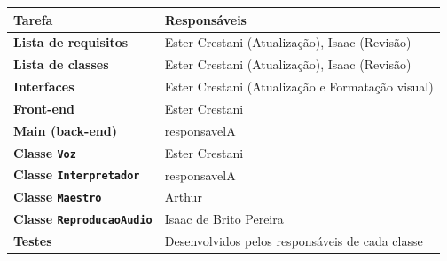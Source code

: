 \documentclass[12pt, a4paper]{article}
\begin{document}
\begin{center}
\begin{tabular}{>{\bfseries}p{4cm} p{9cm}}
  \toprule
  Tarefa & Responsáveis \\
  \midrule
  Lista de requisitos & Ester Crestani (Atualização), Isaac (Revisão) \\
  Lista de classes & Ester Crestani (Atualização), Isaac (Revisão) \\
  Interfaces & Ester Crestani (Atualização e Formatação visual) \\
  Front-end & Ester Crestani \\
  Main (back-end) & responsavelA \\
  Classe \texttt{Voz} & Ester Crestani \\
  Classe \texttt{Interpretador} & responsavelA \\
  Classe \texttt{Maestro} & Arthur \\
  Classe \texttt{ReproducaoAudio} & Isaac de Brito Pereira \\
  Testes & Desenvolvidos pelos responsáveis de cada classe \\
  \bottomrule
\end{tabular}
\end{center}
\end{document}
